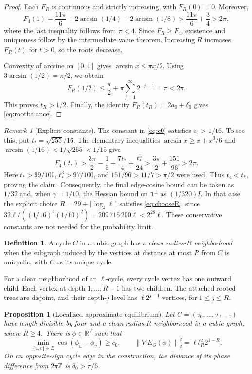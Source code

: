 \documentclass[11pt]{article}
\newtheorem{proposition}[theorem]{Proposition}
\theoremstyle{definition}
\newtheorem{definition}[theorem]{Definition}
\theoremstyle{remark}
\newtheorem{remark}[theorem]{Remark}
\newcommand{\R}{\mathbb R}
\newcommand{\one}{\mathbf 1}
\newcommand{\norm}[1]{\left\lVert#1\right\rVert}
\newcommand{\asin}{\operatorname{arcsin}}
\begin{document}
\begin{proof}
Each $F_R$ is continuous and strictly increasing, with $F_R(0)=0$.
Moreover,
\[
 F_4(1)=\frac{11\pi}{6}+2\asin(1/4)+2\asin(1/8)
       >\frac{11\pi}{6}+\frac34>2\pi,
\]
where the last inequality follows from $\pi<4$.
Since $F_R\ge F_4$, existence and uniqueness follow by the intermediate
value theorem. Increasing $R$ increases $F_R(t)$ for $t>0$, so the roots
decrease.

Convexity of arcsine on $[0,1]$ gives $\asin x\le\pi x/2$.
Using $3\asin(1/2)=\pi/2$, we obtain
\[
 F_R(1/2)\le\frac\pi2+\pi\sum_{j=1}^{\infty}2^{-j-1}=\pi<2\pi.
\]
This proves $t_R>1/2$. Finally, the identity
$F_R(t_R)=2a_0+\delta_0$ gives \eqref{eq:rootbalance}.
\end{proof}

\begin{remark}[Explicit constants]\label{rem:constants}
The constant in \eqref{eq:c0} satisfies $c_0>1/16$. To see this, put
$t_*=\sqrt{255}/16$. The elementary inequalities
$\asin x\ge x+x^3/6$ and
$\asin(1/16)<1/\sqrt{255}<1/15$ give
\[
 F_4(t_*)>
 \frac{3\pi}{2}-\frac15+\frac{7t_*}{4}+\frac{t_*^3}{24}
 >\frac{3\pi}{2}+\frac{151}{96}>2\pi.
\]
Here $t_*>99/100$, $t_*^3>97/100$, and
$151/96>11/7>\pi/2$ were used. Thus $t_4<t_*$, proving the claim.
Consequently, the final edge-cosine bound can be taken as $1/32$ and,
when $\gamma=1/10$, the Hessian bound on $\one^\perp$ as $(1/320)I$.
In that case the explicit choice
$R=29+\lceil\log_2\ell\rceil$ satisfies \eqref{eq:chooseR}, since
$32\ell/((1/16)^4(1/10)^2)=209\,715\,200\ell<2^{28}\ell$.
These conservative constants are not needed for the probability limit.
\end{remark}

\begin{definition}\label{def:clean}
A cycle $C$ in a cubic graph has a \emph{clean radius-$R$ neighborhood} when
the subgraph induced by the vertices at distance at most $R$ from $C$ is
unicyclic, with $C$ as its unique cycle.
\end{definition}

For a clean neighborhood of an $\ell$-cycle, every cycle vertex has one
outward child. Each vertex at depth $1,\ldots,R-1$ has two children. The
attached rooted trees are disjoint, and their depth-$j$ level has
$\ell2^{j-1}$ vertices, for $1\le j\le R$.

\begin{proposition}[Localized approximate equilibrium]\label{prop:localized}
Let $C=(v_0,\ldots,v_{\ell-1})$ have length divisible by four and a clean
radius-$R$ neighborhood in a cubic graph, where $R\ge4$. There is
$\phi\in\R^V$ such that
\begin{equation}\label{eq:localized-estimates}
 \min_{\{u,v\}\in E}\cos(\phi_u-\phi_v)\ge c_0,
 \qquad \norm{\nabla E_G(\phi)}_2^2=\ell t_R^2 2^{1-R}.
\end{equation}
On an opposite-sign cycle edge in the construction, the distance of its
phase difference from $2\pi\mathbb Z$ is $\delta_0>\pi/6$.
\end{proposition}
\end{document}
